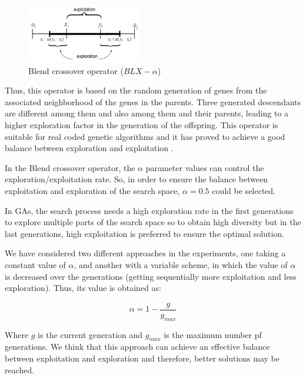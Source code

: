 \documentclass[10pt,journal,compsoc]{IEEEtran}
\begin{document}
\begin{figure}[!ht]	
	\begin{center}
		\includegraphics[width=5cm]{fig/blxalpha.jpg}
		\caption{Blend crossover operator ($BLX-\alpha$)}
		\label{fig:blxalpha}	
	\end{center}	
\end{figure}

Thus, this operator is based on the random generation of genes from the associated neighborhood of the genes in the parents. Three generated descendants are different among them and also among them and their parents, leading to a higher exploration factor in the generation of the offspring.
This operator is suitable for real coded genetic algorithms and it has proved to achieve a good balance between exploration and exploitation \cite{blx2008}.

In the Blend crossover operator, the $\alpha$ parameter values can control the exploration/exploitation rate. So, in order to ensure the balance between exploitation and exploration of the search space, $\alpha = 0.5$ could be selected.

In GAs, the search process needs a high exploration rate in the first generations to explore multiple parts of the search space so to obtain high diversity but in the last generations, high exploitation is preferred to ensure the optimal solution.

We have considered two different approaches in the experiments, one taking a  constant value of $\alpha$, and another with a variable scheme, in which the value of $\alpha$ is decreased over the generations (getting sequentially more exploitation and less exploration). Thus, its value is obtained as:

\begin{equation}
	\label{eqalpha}
	\alpha =1-\frac{g}{g_{max}}
\end{equation}

Where $g$ is the current generation and $g_{max}$ is the maximum number pf generations. We think that this approach can achieve an effective balance between exploitation and exploration and therefore, better solutions may be reached.
\end{document}
